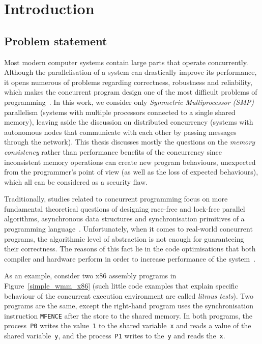 \chapter{Introduction}
\label{ch:intro}


\section{Problem statement}
\label{ch:intro:problem}

Most modern computer systems contain large parts that operate concurrently.
Although the parallelisation of a system can drastically improve its performance, it opens numerous of problems regarding correctness, robustness and reliability, which makes the concurrent program design one of the most difficult problems of programming~\cite{mckenney2017parallel}.
In this work, we consider only \textit{Symmetric Multiprocessor (SMP)} parallelism (systems with multiple processors connected to a single shared memory), leaving aside the discussion on distributed concurrency (systems with autonomous nodes that communicate with each other by passing messages through the network).
This thesis discusses mostly the questions on the \textit{memory consistency} rather than performance benefits of the concurrency since inconsistent memory operations can create new program behaviours, unexpected from the programmer's point of view (as well as the loss of expected behaviours), which all can be considered as a security flaw.

Traditionally, studies related to concurrent programming focus on more fundamental theoretical questions of designing race-free and lock-free parallel algorithms, asynchronous data structures and synchronisation primitives of a programming language~\cite{ben2006principles}.
Unfortunately, when it comes to real-world concurrent programs, the algorithmic level of abstraction is not enough for guaranteeing their correctness.
The reasons of this fact lie in the code optimisations that both compiler and hardware perform in order to increase performance of the system~\cite{adve1996shared}.

As an example, consider two x86 assembly programs in Figure~\ref{simple_wmm_x86} (such little code examples that explain specific behaviour of the concurrent execution environment are called \textit{litmus tests}).
Two programs are the same, except the right-hand program uses the synchronisation instruction \texttt{MFENCE} after the store to the shared memory.
In both programs, the process~\texttt{P0} writes the value~\texttt{1} to the shared variable~\texttt{x} and reads a value of the shared variable~\texttt{y}, and the process~\texttt{P1} writes to the~\texttt{y} and reads the~\texttt{x}.

